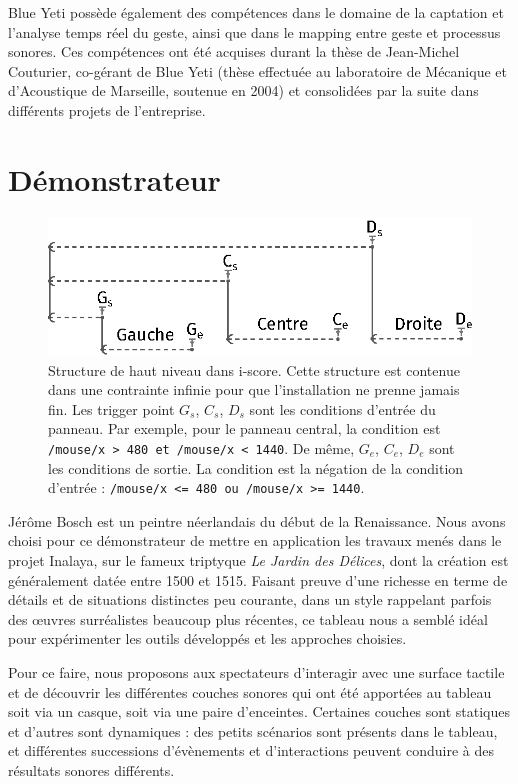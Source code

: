 \documentclass{article}
\begin{document}
    Blue Yeti possède également des compétences dans le domaine de la captation et l’analyse temps 
    réel du geste, ainsi que dans le mapping entre geste et processus sonores. Ces compétences ont 
    été acquises durant la thèse de Jean-Michel Couturier, co-gérant de Blue Yeti (thèse effectuée au 
    laboratoire de Mécanique et d’Acoustique de Marseille, soutenue en 2004) et consolidées par la suite dans différents projets de l’entreprise.
    \section*{Démonstrateur}
    \begin{figure}[h]
        \centering
        \includegraphics{images/1stcase.eps}
        \caption{Structure de haut niveau dans i-score. Cette structure est contenue dans une contrainte infinie pour que l'installation ne prenne jamais fin. Les trigger point $G_s$, $C_s$, $D_s$ sont les conditions d'entrée du panneau. Par exemple, pour le panneau central, la condition est \lstinline{/mouse/x > 480 et /mouse/x < 1440}. De même, $G_e$, $C_e$, $D_e$ sont les conditions de sortie. La condition est la négation de la condition d'entrée : \lstinline{/mouse/x <= 480 ou /mouse/x >= 1440}.}
        \label{fig.1stlevel}
    \end{figure}
    Jérôme Bosch est un peintre néerlandais du début de la Renaissance.
    Nous avons choisi pour ce démonstrateur de mettre en application les travaux menés dans le projet Inalaya, sur le fameux triptyque \emph{Le Jardin des Délices}, dont la création est généralement datée entre 1500 et 1515. 
    Faisant preuve d'une richesse en terme de détails et de situations distinctes peu courante, dans un style rappelant parfois des œuvres surréalistes beaucoup plus récentes, ce tableau nous a semblé idéal pour expérimenter les outils développés et les approches choisies.
    
    Pour ce faire, nous proposons aux spectateurs d'interagir avec une surface tactile et de découvrir les différentes couches sonores qui ont été apportées au tableau soit via un casque, soit via une paire d'enceintes.
    Certaines couches sont statiques et d'autres sont dynamiques : des petits scénarios sont présents dans le tableau, et différentes successions d'évènements et d'interactions peuvent conduire à des résultats sonores différents.
    
\end{document}

